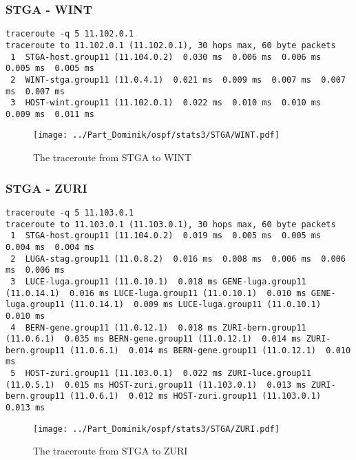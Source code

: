 \subsubsection{STGA - WINT}
\begin{lstlisting}
traceroute -q 5 11.102.0.1
traceroute to 11.102.0.1 (11.102.0.1), 30 hops max, 60 byte packets
 1  STGA-host.group11 (11.104.0.2)  0.030 ms  0.006 ms  0.006 ms  0.005 ms  0.005 ms
 2  WINT-stga.group11 (11.0.4.1)  0.021 ms  0.009 ms  0.007 ms  0.007 ms  0.007 ms
 3  HOST-wint.group11 (11.102.0.1)  0.022 ms  0.010 ms  0.010 ms  0.009 ms  0.011 ms
\end{lstlisting}
\begin{figure}[H]
\centering
\texttt{[image: ../Part\_Dominik/ospf/stats3/STGA/WINT.pdf]}
\caption{The traceroute from STGA to WINT}
\end{figure}
\clearpage
\subsubsection{STGA - ZURI}
\begin{lstlisting}
traceroute -q 5 11.103.0.1
traceroute to 11.103.0.1 (11.103.0.1), 30 hops max, 60 byte packets
 1  STGA-host.group11 (11.104.0.2)  0.019 ms  0.005 ms  0.005 ms  0.004 ms  0.004 ms
 2  LUGA-stag.group11 (11.0.8.2)  0.016 ms  0.008 ms  0.006 ms  0.006 ms  0.006 ms
 3  LUCE-luga.group11 (11.0.10.1)  0.018 ms GENE-luga.group11 (11.0.14.1)  0.016 ms LUCE-luga.group11 (11.0.10.1)  0.010 ms GENE-luga.group11 (11.0.14.1)  0.009 ms LUCE-luga.group11 (11.0.10.1)  0.010 ms
 4  BERN-gene.group11 (11.0.12.1)  0.018 ms ZURI-bern.group11 (11.0.6.1)  0.035 ms BERN-gene.group11 (11.0.12.1)  0.014 ms ZURI-bern.group11 (11.0.6.1)  0.014 ms BERN-gene.group11 (11.0.12.1)  0.010 ms
 5  HOST-zuri.group11 (11.103.0.1)  0.022 ms ZURI-luce.group11 (11.0.5.1)  0.015 ms HOST-zuri.group11 (11.103.0.1)  0.013 ms ZURI-bern.group11 (11.0.6.1)  0.012 ms HOST-zuri.group11 (11.103.0.1)  0.013 ms
\end{lstlisting}
\begin{figure}[H]
\centering
\texttt{[image: ../Part\_Dominik/ospf/stats3/STGA/ZURI.pdf]}
\caption{The traceroute from STGA to ZURI}
\end{figure}
\clearpage

